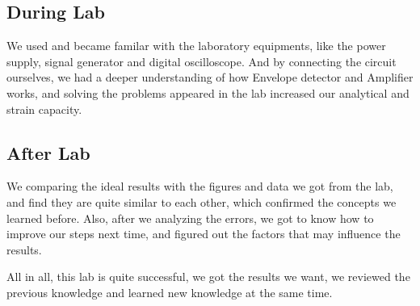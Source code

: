\documentclass[12pt]{article}
\begin{document}
\subsection{During Lab}
We used and became familar with the laboratory equipments, like the power supply, signal generator and digital oscilloscope. And by connecting the circuit ourselves, we had a deeper understanding of how Envelope detector and Amplifier works, and solving the problems appeared in the lab increased our analytical and strain capacity. 
\subsection{After Lab}
We comparing the ideal results with the figures and data we got from the lab, and find they are quite similar to each other, which confirmed the concepts we learned before. Also, after we analyzing the errors, we got to know how to improve our steps next time, and figured out the factors that may influence the results.
\par All in all, this lab is quite successful, we got the results we want, we reviewed the previous knowledge and learned new knowledge at the same time.
\end{document}
